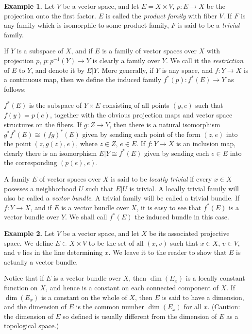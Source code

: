 \textbf{Example 1.} Let $V$ be a vector space, and let $E = X \times V$, $p: E \to X$ be the projection onto the first factor. $E$ is called the \textit{product family} with fiber $V$. If $F$ is any family which is isomorphic to some product family, $F$ is said to be a \textit{trivial} family. \par

If $Y$ is a subspace of $X$, and if $E$ is a family of vector spaces over $X$ with projection $p$, $p: p^{-1}(Y) \to Y$ is clearly a family over $Y$. We call it the \textit{restriction} of $E$ to $Y$, and denote it by $E \vert Y$. More generally, if $Y$ is any space, and $f: Y \to X$ is a continuous map, then we define the induced family $f^*(p): f^*(E) \to Y$ as follows: \par

$f^*(E)$ is the subspace of $Y \times E$ consisting of all points $(y, e)$ such that $f(y) = p(e)$, together with the obvious projection maps and vector space structures on the fibers. If $g: Z \to Y$, then there is a natural isomorphism $g^* f^*(E) \cong (fg)^*(E)$ given by sending each point of the form $(z, e)$ into the point $(z, g(z), e)$, where $z \in Z$, $e \in E$. If $f: Y \to X$ is an inclusion map, clearly there is an isomorphism $E \vert Y \cong f^*(E)$ given by sending each $e \in E$ into the corresponding $(p(e), e)$.

A family $E$ of vector spaces over $X$ is said to be \textit{locally trivial} if every $x \in X$ posesses a neighborhood $U$ such that $E \vert U$ is trivial. A locally trivial family will also be called a \textit{vector bundle}. A trivial family will be called a trivial bundle. If $f: Y \to X$, and if $E$ is a vector bundle over $X$, it is easy to see that $f^*(E)$ is a vector bundle over $Y$. We shall call $f^*(E)$ the induced bundle in this case. \par \pagebreak

\textbf{Example 2.} Let $V$ be a vector space, and let $X$ be its associated projective space. We define $E \subset X \times V$ to be the set of all $(x, v)$ such that $x \in X$, $v \in V$, and $v$ lies in the line determining $x$. We leave it to the reader to show that $E$ is actually a vector bundle. \par

Notice that if $E$ is a vector bundle over $X$, then $\dim(E_x)$ is a locally constant function on $X$, and hence is a constant on each connected component of $X$. If $\dim(E_x)$ is a constant on the whole of $X$, then $E$ is said to have a dimension, and the dimension of $E$ is the common number $\dim(E_x)$ for all $x$. (Caution: the dimension of $E$ so defined is usually different from the dimension of $E$ as a topological space.) \par


